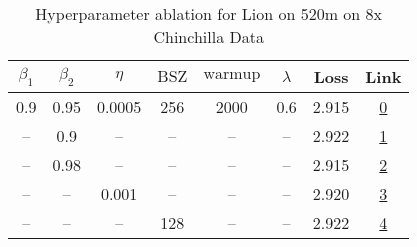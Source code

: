 \begin{table}[H]
\centering
\caption{Hyperparameter ablation for Lion on 520m on 8x Chinchilla Data}
\label{tab:ablation_lion_520m_8}
\begin{tabular}{cccccccc}
\toprule
$\beta_1$ & $\beta_2$ & $\eta$ & $\mathrm{BSZ}$ & $\mathrm{warmup}$ & $\lambda$ & Loss & Link \\
\midrule
0.9 & 0.95 & 0.0005 & 256 & 2000 & 0.6 & 2.915 & \href{https://wandb.ai/stanford-mercury/optimizer-scaling/runs/sweep-520m-85B-lionf86a38lr0.0005-wd0.6-minlr0-warmup2000-b10.9--54ea21}{0} \\
\midrule
-- & 0.9 & -- & -- & -- & -- & 2.922 & \href{https://wandb.ai/stanford-mercury/optimizer-scaling/runs/sweep-520m-85B-lion75027blr0.0005-wd0.6-minlr0-warmup2000-b10.9--094576}{1} \\
-- & 0.98 & -- & -- & -- & -- & 2.915 & \href{https://wandb.ai/stanford-mercury/optimizer-scaling/runs/sweep-520m-85B-lion1c2a3blr0.0005-wd0.6-minlr0-warmup2000-b10.9--fdc97c}{2} \\
-- & -- & 0.001 & -- & -- & -- & 2.920 & \href{https://wandb.ai/stanford-mercury/optimizer-scaling/runs/sweep-520m-85B-lion2b623elr0.001-wd0.6-minlr0-warmup2000-b10.9-b-a6a1ef}{3} \\
-- & -- & -- & 128 & -- & -- & 2.922 & \href{https://wandb.ai/stanford-mercury/optimizer-scaling/runs/sweep-520m-85B-liond118d4lr0.0005-wd0.6-minlr0-warmup2000-b10.9--8f527b}{4} \\
\bottomrule
\end{tabular}
\end{table}


